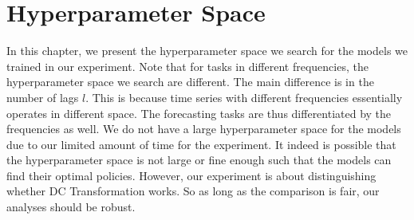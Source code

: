 \chapter{Hyperparameter Space}\label{apdx: hyper space}
In this chapter, we present the hyperparameter space we search for the models we trained in our experiment. Note that for tasks in different frequencies, the hyperparameter space we search are different. The main difference is in the number of lags $l$. This is because time series with different frequencies essentially operates in different space. The forecasting tasks are thus differentiated by the frequencies as well. We do not have a large hyperparameter space for the models due to our limited amount of time for the experiment. It indeed is possible that the hyperparameter space is not large or fine enough such that the models can find their optimal policies. However, our experiment is about distinguishing whether DC Transformation works. So as long as the comparison is fair, our analyses should be robust.
